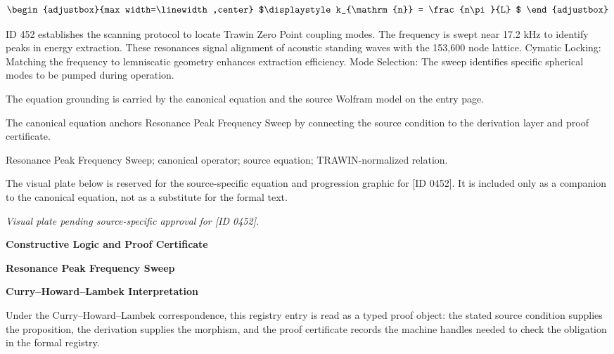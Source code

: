 \[
\begin{adjustbox}{max width=\linewidth,center}
$\displaystyle
k_{\mathrm{n}} = \frac{n\pi}{L}
$
\end{adjustbox}
\]

ID 452 establishes the scanning protocol to locate Trawin Zero Point coupling modes. The frequency is swept near 17.2 kHz to identify peaks in energy extraction. These resonances signal alignment of acoustic standing waves with the 153,600 node lattice. Cymatic Locking: Matching the frequency to lemniscatic geometry enhances extraction efficiency. Mode Selection: The sweep identifies specific spherical modes to be pumped during operation.

The equation grounding is carried by the canonical equation and the source Wolfram model on the entry page.

The canonical equation anchors Resonance Peak Frequency Sweep by connecting the source condition to the derivation layer and proof certificate.

Resonance Peak Frequency Sweep; canonical operator; source equation; TRAWIN-normalized relation.
\endgroup

\begingroup\footnotesize\sloppy
The visual plate below is reserved for the source-specific equation and progression graphic for [ID 0452]. It is included only as a companion to the canonical equation, not as a substitute for the formal text.
\par\endgroup
\begingroup\footnotesize\itshape
Visual plate pending source-specific approval for [ID 0452].
\par\endgroup

\clearpage
\begingroup\tzpsupportsetup
\noindent\textbf{\fontsize{10.8pt}{12.8pt}\selectfont [ID 0452] Constructive Logic and Proof Certificate}\par
\noindent\textbf{\fontsize{10pt}{12pt}\selectfont Resonance Peak Frequency Sweep}\par
\vspace{0.45em}
\begingroup
\footnotesize
\setlength{\parskip}{0.22em}
\setlength{\parindent}{0pt}
\noindent\textbf{Curry--Howard--Lambek Interpretation}\par
Under the Curry--Howard--Lambek correspondence, this registry entry is read as a typed proof
object: the stated source condition supplies the proposition, the derivation supplies the
morphism, and the proof certificate records the machine handles needed to check the obligation
in the formal registry.

